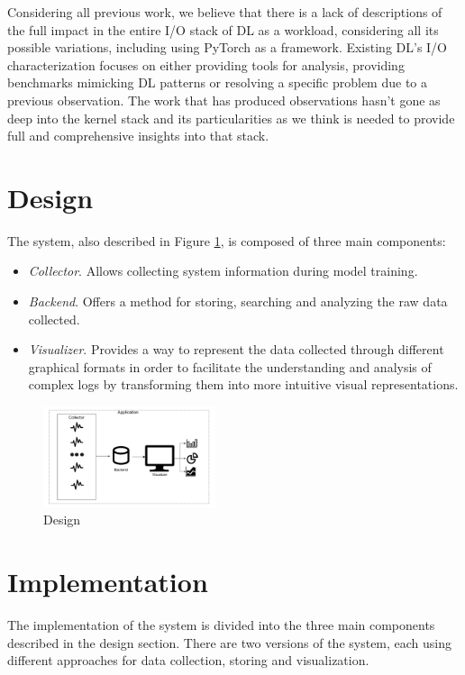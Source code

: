 \documentclass[conference]{IEEEtran}
\begin{document}
Considering all previous work, we believe that there is a lack of descriptions of the full impact in the entire I/O stack of DL as a workload, considering all its possible variations, including using PyTorch as a framework. Existing DL's I/O characterization focuses on either providing tools for analysis, providing benchmarks mimicking DL patterns or resolving a specific problem due to a previous observation. The work that has produced observations hasn't gone as deep into the kernel stack and its particularities as we think is needed to provide full and comprehensive insights into that stack. 

\section{Design}
The system, also described in Figure \ref{fig:Design}, is composed of three main components:
\begin{itemize}
	\item \textit{Collector}. Allows collecting system information during model training.
	\item \textit{Backend}. Offers a method for storing, searching and analyzing the raw data collected.
	\item \textit{Visualizer}. Provides a way to represent the data collected through different graphical formats in order to facilitate the understanding and analysis of complex logs by transforming them into more intuitive visual representations.
\end{itemize}

\begin{figure}[htbp]
	\centering
	\includegraphics[width=0.45\textwidth]{images/DesignPIV3.pdf}
	\caption{Design}
	\label{fig:Design}
\end{figure}

\section{Implementation}
The implementation of the system is divided into the three main components described in the design section.
There are two versions of the system, each using different approaches for data collection, storing and visualization.
\end{document}
